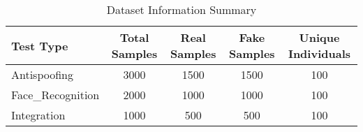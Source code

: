 \begin{table}[htbp]
\centering
\caption{Dataset Information Summary}
\label{tab:dataset_info}
\begin{tabular}{|l|c|c|c|c|}
\hline
\textbf{Test Type} & \textbf{Total Samples} & \textbf{Real Samples} & \textbf{Fake Samples} & \textbf{Unique Individuals} \\
\hline
Antispoofing & 3000 & 1500 & 1500 & 100 \\
\hline
Face_Recognition & 2000 & 1000 & 1000 & 100 \\
\hline
Integration & 1000 & 500 & 500 & 100 \\
\hline
\end{tabular}
\end{table}
